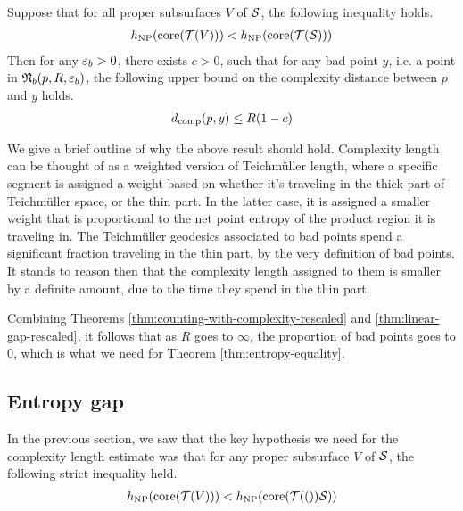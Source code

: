 \begin{theorem}
  \label{thm:linear-gap-rescaled}
  Suppose that for all proper subsurfaces $V$ of $\mathcal{S}$, the following inequality holds.
  \begin{align*}
    h_{\mathrm{NP}}(\mathrm{core}(\mathcal{T}(V))) < h_{\mathrm{NP}}(\mathrm{core}(\mathcal{T}(\mathcal{S})))
  \end{align*}
  Then for any $\varepsilon_b >0$, there exists $c > 0$, such that for any bad point $y$, i.e. a point in $\mathfrak{N}_b(p, R, \varepsilon_b)$, the following upper bound on the complexity distance between $p$ and $y$ holds.
  \begin{align*}
    d_{\mathrm{comp}}(p, y) \leq R(1 - c)
  \end{align*}
\end{theorem}
\begin{remark}
  We give a brief outline of why the above result should hold.
  Complexity length can be thought of as a weighted version of Teichmüller length, where a specific segment is assigned a weight based on whether it's traveling in the thick part of Teichmüller space, or the thin part.
  In the latter case, it is assigned a smaller weight that is proportional to the net point entropy of the product region it is traveling in.
  The Teichmüller geodesics associated to bad points spend a significant fraction traveling in the thin part, by the very definition of bad points.
  It stands to reason then that the complexity length assigned to them is smaller by a definite amount, due to the time they spend in the thin part.
\end{remark}

Combining Theorems \ref{thm:counting-with-complexity-rescaled} and \ref{thm:linear-gap-rescaled}, it follows that as $R$ goes to $\infty$, the proportion of bad points goes to $0$, which is what we need for Theorem \ref{thm:entropy-equality}.

\subsection{Entropy gap}
\label{sec:entr-gap-cons}

In the previous section, we saw that the key hypothesis we need for the complexity length estimate was that for any proper subsurface $V$ of $\mathcal{S}$, the following strict inequality held.
\begin{align}
  \label{eq:net-point-entropy-gap}
  h_{\mathrm{NP}}(\mathrm{core}(\mathcal{T}(V))) < h_{\mathrm{NP}}(\mathrm{core}(\mathcal{T}(())\mathcal{S}))
\end{align}

